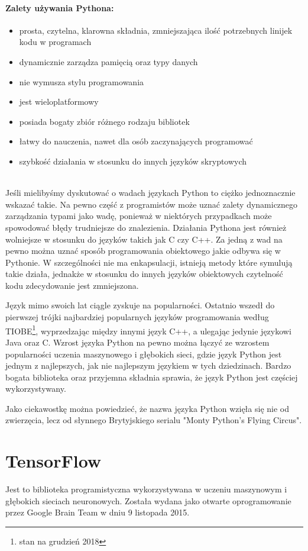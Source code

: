 \documentclass[a4paper,12pt,twoside,openany]{report}
\begin{document}
\paragraph{Zalety używania Pythona:}
\begin{itemize} 
	\item prosta, czytelna, klarowna składnia, zmniejszająca ilość potrzebnych linijek kodu w programach
	\item dynamicznie zarządza pamięcią oraz typy danych
	\item nie wymusza stylu programowania
	\item jest wieloplatformowy
	\item posiada bogaty zbiór różnego rodzaju bibliotek
	\item łatwy do nauczenia, nawet dla osób zaczynających programować
	\item szybkość działania w stosunku do innych języków skryptowych
\end{itemize} 
\mbox{} \\
Jeśli mielibyśmy dyskutować o wadach językach Python to ciężko jednoznacznie wskazać takie. Na pewno część z programistów może uznać zalety dynamicznego zarządzania typami jako wadę, ponieważ w niektórych przypadkach może spowodować błędy trudniejsze do znalezienia. Działania Pythona jest również wolniejsze w stosunku do języków takich jak C czy C++.  Za jedną z wad na pewno można uznać sposób programowania obiektowego jakie odbywa się w Pythonie. W szczególności nie ma enkapsulacji, istnieją metody które symulują takie działa, jednakże w stosunku do innych języków  obiektowych czytelność kodu zdecydowanie jest zmniejszona.

Język mimo swoich lat ciągle zyskuje na popularności. Ostatnio wszedł do pierwszej trójki najbardziej popularnych języków programowania według TIOBE\footnote{stan na grudzień 2018}, wyprzedzając między innymi język C++, a ulegając jedynie językowi Java oraz C. Wzrost języka Python na pewno można łączyć ze wzrostem popularności uczenia maszynowego i głębokich sieci, gdzie język Python jest jednym z najlepszych, jak nie najlepszym językiem w tych dziedzinach. Bardzo bogata biblioteka oraz przyjemna składnia sprawia, że język Python jest częściej wykorzystywany.  

Jako ciekawostkę można powiedzieć, że nazwa języka Python wzięła się nie od zwierzęcia, lecz od słynnego Brytyjskiego serialu "Monty Python’s Flying Circus".

\section{TensorFlow}
Jest to biblioteka programistyczna wykorzystywana w uczeniu maszynowym i głębokich sieciach neuronowych. Została wydana jako otwarte oprogramowanie przez Google Brain Team w dniu 9 listopada 2015.
\end{document}
